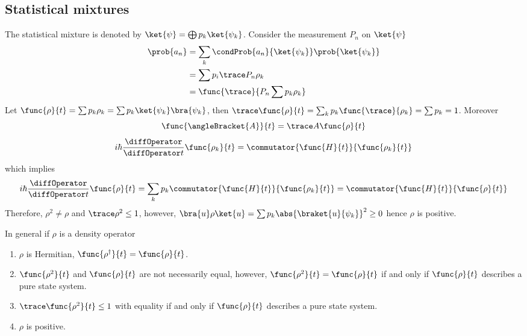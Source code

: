 \subsection{Statistical mixtures}
The statistical mixture is denoted by \(\ket{\psi} = \bigoplus p_k \ket{\psi_k}\). Consider the measurement \(P_n\) on \(\ket{\psi}\)
\begin{align*}
    \prob{a_n} & = \sum_{k} \condProb{a_n}{\ket{\psi_k}} \prob{\ket{\psi_k}} \\
               & = \sum p_i \trace P_n \rho_k                                \\
               & = \func{\trace}{ P_n \sum p_k \rho_k}
\end{align*}
Let \(\func{\rho}{t} = \sum p_k \rho_k = \sum p_k \ket{\psi_k} \bra{\psi_k}\), then \(\trace \func{\rho}{t} = \sum_k p_k \func{\trace}{\rho_k} = \sum p_k = 1\). Moreover
\begin{equation*}
    \func{\angleBracket{A}}{t} = \trace A \func{\rho}{t}
\end{equation*}
\begin{equation*}
    i \hbar \dfrac{\diffOperator}{\diffOperator t} \func{\rho_k}{t} = \commutator{\func{H}{t}}{\func{\rho_k}{t}}
\end{equation*}
which implies
\begin{equation*}
    i \hbar \dfrac{\diffOperator}{\diffOperator t} \func{\rho}{t} = \sum_k p_k\commutator{\func{H}{t}}{ \func{\rho_k}{t}}=  \commutator{\func{H}{t}}{\func{\rho}{t}}
\end{equation*}
Therefore, \(\rho^2 \neq \rho\) and \(\trace \rho^2 \leq 1\), however, \(\bra{u} \rho \ket{u} = \sum p_k \abs{\braket{u}{\psi_k} }^2 \geq 0\) hence \(\rho\) is positive.

\begin{proposition}
    In general if \(\rho\) is a density operator
    \begin{enumerate}
        \item  \(\rho\) is Hermitian, \(\func{\rho^{\dagger}}{t} = \func{\rho}{t}\).
        \item \(\func{\rho^2}{t}\) and \(\func{\rho}{t}\) are not necessarily equal, however, \(\func{\rho^2}{t} = \func{\rho}{t}\) if and only if \(\func{\rho}{t}\) describes a pure state system.
        \item \(\trace \func{\rho^2}{t} \leq 1\) with equality if and only if \(\func{\rho}{t}\) describes a pure state system.
        \item \(\rho\) is positive.
    \end{enumerate}
\end{proposition}
